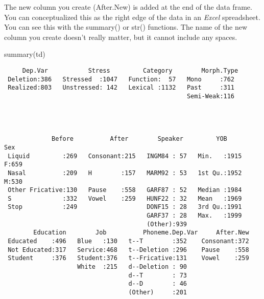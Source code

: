 \documentclass[
  12pt,
  letterpaper]{article}
\newenvironment{Shaded}{\begin{snugshade}}{\end{snugshade}}
\newcommand{\FunctionTok}[1]{\textcolor[rgb]{0.28,0.35,0.67}{#1}}
\newcommand{\NormalTok}[1]{\textcolor[rgb]{0.00,0.23,0.31}{#1}}
\renewcommand\texttt[1]{{\ttfamily\color{BrickRed}#1}}
\begin{document}
The new column you create (\texttt{After.New}) is added at the end of
the data frame. You can conceptualized this as the right edge of the
data in an \emph{Excel} spreadsheet. You can see this with the
\texttt{summary()} or \texttt{str()} functions. The name of the new
column you create doesn't really matter, but it cannot include any
spaces.

\begin{Shaded}
\begin{Highlighting}[]
\FunctionTok{summary}\NormalTok{(td)}
\end{Highlighting}
\end{Shaded}

\begin{verbatim}
     Dep.Var           Stress         Category        Morph.Type 
 Deletion:386   Stressed  :1047   Function:  57   Mono     :762  
 Realized:803   Unstressed: 142   Lexical :1132   Past     :311  
                                                  Semi-Weak:116  
                                                                 
                                                                 
                                                                 
                                                                 
             Before          After        Speaker         YOB       Sex    
 Liquid         :269   Consonant:215   INGM84 : 57   Min.   :1915   F:659  
 Nasal          :209   H        :157   MARM92 : 53   1st Qu.:1952   M:530  
 Other Fricative:130   Pause    :558   GARF87 : 52   Median :1984          
 S              :332   Vowel    :259   HUNF22 : 32   Mean   :1969          
 Stop           :249                   DONF15 : 28   3rd Qu.:1991          
                                       GARF37 : 28   Max.   :1999          
                                       (Other):939                         
        Education        Job          Phoneme.Dep.Var     After.New  
 Educated    :496   Blue   :130   t--T        :352    Consonant:372  
 Not Educated:317   Service:468   t--Deletion :296    Pause    :558  
 Student     :376   Student:376   t--Fricative:131    Vowel    :259  
                    White  :215   d--Deletion : 90                   
                                  d--T        : 73                   
                                  d--D        : 46                   
                                  (Other)     :201                   
\end{verbatim}
\end{document}
